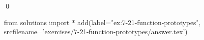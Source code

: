 
\begin{ex}
  \label{ex:7-21-function-prototypes}
  
  \qed
\end{ex}
\begin{python0}
from solutions import *
add(label="ex:7-21-function-prototypes",
    srcfilename='exercises/7-21-function-prototypes/answer.tex')
\end{python0}
